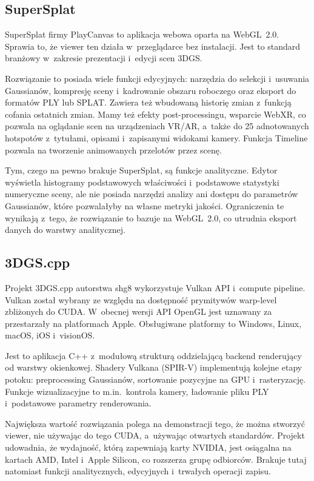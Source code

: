 \subsection{SuperSplat}
\label{subsec:supersplat}

SuperSplat firmy PlayCanvas to aplikacja webowa oparta na WebGL~2.0. Sprawia
to, że viewer ten działa w~przeglądarce bez instalacji. Jest to standard
branżowy w~zakresie prezentacji i~edycji scen 3DGS.

Rozwiązanie to posiada wiele funkcji edycyjnych: narzędzia do selekcji
i~usuwania Gaussianów, kompresję sceny i~kadrowanie obszaru roboczego oraz
eksport do formatów PLY lub SPLAT. Zawiera też wbudowaną historię zmian
z~funkcją cofania ostatnich zmian. Mamy też efekty post-processingu, wsparcie
WebXR, co pozwala na oglądanie scen na urządzeniach VR/AR, a~także do 25
adnotowanych hotspotów z~tytułami, opisami i~zapisanymi widokami kamery.
Funkcja Timeline pozwala na tworzenie animowanych przelotów przez scenę.

Tym, czego na pewno brakuje SuperSplat, są funkcje analityczne. Edytor
wyświetla histogramy podstawowych właściwości i~podstawowe statystyki
numeryczne sceny, ale nie posiada narzędzi analizy ani dostępu do parametrów
Gaussianów, które pozwalałyby na własne metryki jakości. Ograniczenia te
wynikają z~tego, że rozwiązanie to bazuje na WebGL~2.0, co utrudnia eksport
danych do warstwy analitycznej.

\subsection{3DGS.cpp}
\label{subsec:3dgscpp}

Projekt 3DGS.cpp autorstwa shg8 wykorzystuje Vulkan API i~compute pipeline.
Vulkan został wybrany ze względu na dostępność prymitywów warp-level zbliżonych
do CUDA. W~obecnej wersji API OpenGL jest uznawany za przestarzały na
platformach Apple. Obsługiwane platformy to Windows, Linux, macOS, iOS
i~visionOS.

Jest to aplikacja C++ z~modułową strukturą oddzielającą backend renderujący od
warstwy okienkowej. Shadery Vulkana (SPIR-V) implementują kolejne etapy
potoku: preprocessing Gaussianów, sortowanie pozycyjne na GPU i~rasteryzację.
Funkcje wizualizacyjne to m.in.\ kontrola kamery, ładowanie pliku PLY
i~podstawowe parametry renderowania.

Największa wartość rozwiązania polega na demonstracji tego, że można stworzyć
viewer, nie używając do tego CUDA, a~używając otwartych standardów. Projekt
udowadnia, że wydajność, którą zapewniają karty NVIDIA, jest osiągalna na
kartach AMD, Intel i~Apple Silicon, co rozszerza grupę odbiorców. Brakuje tutaj
natomiast funkcji analitycznych, edycyjnych i~trwałych operacji zapisu.


